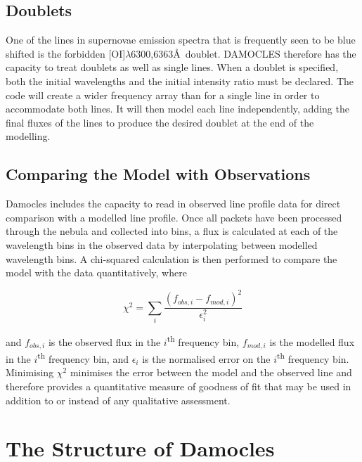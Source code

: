 	\subsection{Doublets}

One of the lines in supernovae emission spectra that is frequently seen to be blue shifted is the forbidden [OI]$\lambda$6300,6363\AA\ doublet.  DAMOCLES therefore has the capacity to treat doublets as well as single lines.  When a doublet is specified, both the initial wavelengths and the initial intensity ratio must be declared.  The code will create a wider frequency array than for a single line in order to accommodate both lines.  It will then model each line independently, adding the final fluxes of the lines to produce the desired doublet at the end of the modelling. 

\subsection{Comparing the Model with Observations}

Damocles includes the capacity to read in observed line profile data for direct comparison with a modelled line profile.  Once all packets have been processed through the nebula and collected into bins, a flux is calculated at each of the wavelength bins in the observed data by interpolating between modelled wavelength bins.  A chi-squared calculation is then performed to compare the model with the data quantitatively, where 
		
		\begin{equation}
		\label{eqn:chi2}
			\chi^2=\sum_i \frac{(f_{obs,i}- f_{mod,i})^2}{\epsilon_i^2}
		\end{equation}		
		
		\noindent and $f_{obs,i}$ is the observed flux in the $i$\textsuperscript{th} frequency bin, $f_{mod,i}$ is the modelled flux in the $i$\textsuperscript{th} frequency bin, and $\epsilon_i$ is the normalised error on the $i$\textsuperscript{th} frequency bin.   Minimising $\chi^2$ minimises the error between the model and the observed line and therefore provides a quantitative measure of goodness of fit that may be used in addition to or instead of any qualitative assessment.
	
\section{The Structure of Damocles}
\label{damocles_struct}
	
